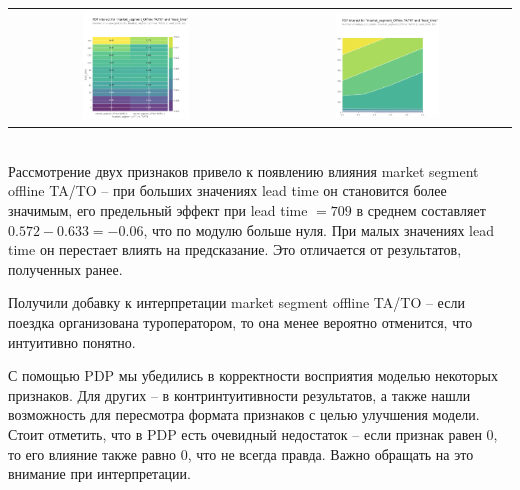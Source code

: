 \begin{tabular}{c|c}
	\arrayrulecolor[rgb]{0.8,0.85,1}
	\includegraphics*[width = 0.44\textwidth]{pics/mypdp9.png} & \includegraphics*[width = 0.44\textwidth]{pics/mypdp10.png}\\
\end{tabular}\\[2mm]

Рассмотрение двух признаков привело к появлению влияния market segment offline TA/TO -- при больших значениях lead time он становится более значимым, его предельный эффект при lead time $=709$ в среднем составляет $0.572-0.633=-0.06$, что по модулю больше нуля. При малых значениях lead time он перестает влиять на предсказание. Это отличается от результатов, полученных ранее.

Получили добавку к интерпретации market segment offline TA/TO -- если поездка организована туроператором, то она менее вероятно отменится, что интуитивно понятно.

С помощью PDP мы убедились в корректности восприятия моделью некоторых признаков. Для других -- в контринтуитивности результатов, а также нашли возможность для пересмотра формата признаков с целью улучшения модели. Стоит отметить, что в PDP есть очевидный недостаток -- если признак равен 0, то его влияние также равно 0, что не всегда правда. Важно обращать на это внимание при интерпретации.

